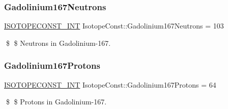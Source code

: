 \subsubsection{\texorpdfstring{Gadolinium167\+Neutrons}{Gadolinium167Neutrons}}
{\footnotesize\ttfamily \mbox{\hyperlink{group___isotope_const-_macros_ga5f18360b3e99483a35c32d789e62621c}{I\+S\+O\+T\+O\+P\+E\+C\+O\+N\+S\+T\+\_\+\+I\+NT}} Isotope\+Const\+::\+Gadolinium167\+Neutrons = 103}

\$ \$ Neutrons in Gadolinium-\/167. \mbox{\label{group___isotope_const-_gadolinium-_gd167_ga035a29767f3f3d67ce2e3108e0233bf3}} 
\subsubsection{\texorpdfstring{Gadolinium167\+Protons}{Gadolinium167Protons}}
{\footnotesize\ttfamily \mbox{\hyperlink{group___isotope_const-_macros_ga5f18360b3e99483a35c32d789e62621c}{I\+S\+O\+T\+O\+P\+E\+C\+O\+N\+S\+T\+\_\+\+I\+NT}} Isotope\+Const\+::\+Gadolinium167\+Protons = 64}

\$ \$ Protons in Gadolinium-\/167. 